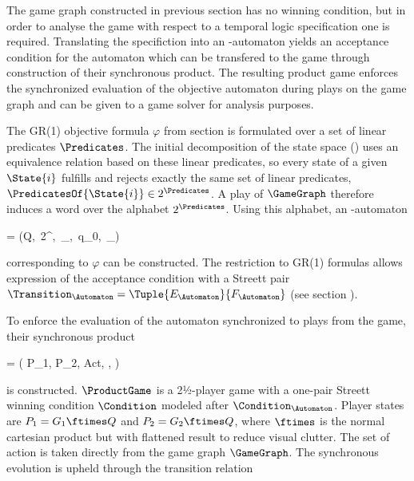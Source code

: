 The game graph constructed in previous section has no winning condition, but in order to analyse the game with respect to a temporal logic specification one is required.
Translating the specifiction into an \omega-automaton yields an acceptance condition for the automaton which can be transfered to the game through construction of their synchronous product.
The resulting product game enforces the synchronized evaluation of the objective automaton during plays on the game graph and can be given to a game solver for analysis purposes.


\startsubsection[title={Objective Automaton}]

    The GR(1) objective formula $\varphi$ from section  is formulated over a set of linear predicates $\Predicates$.
    The initial decomposition of the state space () uses an equivalence relation based on these linear predicates, so every state of a given $\State{i}$ fulfills and rejects exactly the same set of linear predicates, $\PredicatesOf{\State{i}} \in 2^\Predicates$.
    A play of $\GameGraph$ therefore induces a word over the alphabet $2^\Predicates$.
    Using this alphabet, an \omega-automaton

    \startformula
        \Automaton = (Q,\, 2^\Predicates,\, \Transition_\Automaton,\, q_0,\, \Condition_\Automaton)
    \stopformula

    corresponding to $\varphi$ can be constructed.
    The restriction to GR(1) formulas allows expression of the acceptance condition with a Streett pair $\Transition_\Automaton = \Tuple{E_\Automaton}{F_\Automaton}$ (see section ).

\stopsubsection


\startsubsection[title={Synchronized Product}]

    To enforce the evaluation of the automaton synchronized to plays from the game, their synchronous product

    \startformula
        \ProductGame = ( P_1, P_2, Act, \Transition, \Condition )
    \stopformula

    is constructed.
    $\ProductGame$ is a 2½-player game with a one-pair Streett winning condition $\Condition$ modeled after $\Condition_\Automaton$.
    Player states are $P_1 = G_1 \ftimes Q$ and $P_2 = G_2 \ftimes Q$, where $\ftimes$ is the normal cartesian product but with flattened result to reduce visual clutter.
    The set of action is taken directly from the game graph $\GameGraph$.
    The synchronous evolution is upheld through the transition relation

